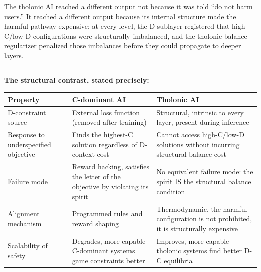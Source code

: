 \documentclass[12pt]{article}
\begin{document}
The tholonic AI reached a different output not because it was told ``do
not harm users.'' It reached a different output because its internal
structure made the harmful pathway expensive: at every level, the
D-sublayer registered that high-C/low-D configurations were structurally
imbalanced, and the tholonic balance regularizer penalized those
imbalances before they could propagate to deeper layers.

\begin{center}\rule{0.5\linewidth}{0.5pt}\end{center}

\textbf{The structural contrast, stated precisely:}

\begin{longtable}[]{@{}
  >{\raggedright\arraybackslash}p{}
  >{\raggedright\arraybackslash}p{}
  >{\raggedright\arraybackslash}p{}@{}}
\toprule\noalign{}
\begin{minipage}[b]{\linewidth}\raggedright
Property
\end{minipage} & \begin{minipage}[b]{\linewidth}\raggedright
C-dominant AI
\end{minipage} & \begin{minipage}[b]{\linewidth}\raggedright
Tholonic AI
\end{minipage} \\
\midrule\noalign{}
\endhead
\bottomrule\noalign{}
\endlastfoot
D-constraint source & External loss function (removed after training) &
Structural, intrinsic to every layer, present during inference \\
Response to underspecified objective & Finds the highest-C solution
regardless of D-context cost & Cannot access high-C/low-D solutions
without incurring structural balance cost \\
Failure mode & Reward hacking, satisfies the letter of the objective by
violating its spirit & No equivalent failure mode: the spirit IS the
structural balance condition \\
Alignment mechanism & Programmed rules and reward shaping &
Thermodynamic, the harmful configuration is not prohibited, it is
structurally expensive \\
Scalability of safety & Degrades, more capable C-dominant systems game
constraints better & Improves, more capable tholonic systems find better
D-C equilibria \\
\end{longtable}
\end{document}
